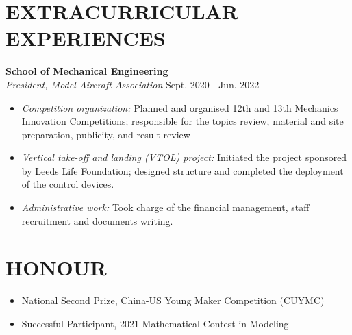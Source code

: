 \documentclass[a4paper,9pt]{extarticle}
\begin{document}
\section*{EXTRACURRICULAR EXPERIENCES}
\noindent
\textbf{School of Mechanical Engineering} \\ %
\textit{President, Model Aircraft Association} \hfill Sept. 2020 | Jun. 2022 %
\begin{itemize}
    \item \textit{Competition organization:} Planned and organised 12th and 13th Mechanics Innovation Competitions; responsible for the topics review, material and site preparation, publicity, and result review
    \item \textit{Vertical take-off and landing (VTOL) project:} Initiated the project sponsored by Leeds Life Foundation; designed structure and completed the deployment of the control devices.
    \item \textit{Administrative work:} Took charge of the financial management, staff recruitment and documents writing.
\end{itemize}

\section*{HONOUR}
\begin{itemize}
    \item National Second Prize, China-US Young Maker Competition (CUYMC)
    \item Successful Participant, 2021 Mathematical Contest in Modeling
\end{itemize}

\end{document}
